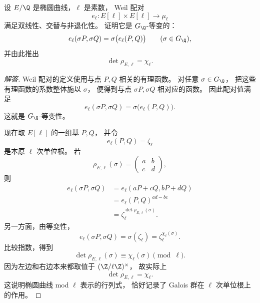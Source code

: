 \begin{exercise}
设 $E/\Q$ 是椭圆曲线，$\ell$ 是素数，
Weil 配对
\[
  e_\ell\colon E[\ell]\times E[\ell]\to \mu_\ell
\]
满足双线性、交替与非退化性。
证明它是 $G_\Q$-等变的：
\[
  e_\ell(\sigma P,\sigma Q)=\sigma\bigl(e_\ell(P,Q)\bigr)
  \qquad (\sigma\in G_\Q),
\]
并由此推出
\[
  \det\rho_{E,\ell}=\chi_\ell.
\]
\end{exercise}

\begin{proof}[解答]
Weil 配对的定义使用与点 $P,Q$ 相关的有理函数。
对任意 $\sigma\in G_\Q$，
把这些有理函数的系数整体施以 $\sigma$，
便得到与点 $\sigma P,\sigma Q$ 相对应的函数。
因此配对值满足
\[
  e_\ell(\sigma P,\sigma Q)=\sigma\bigl(e_\ell(P,Q)\bigr).
\]
这就是 $G_\Q$-等变性。

现在取 $E[\ell]$ 的一组基 $P,Q$，
并令
\[
  e_\ell(P,Q)=\zeta_\ell
\]
是本原 $\ell$ 次单位根。
若
\[
  \rho_{E,\ell}(\sigma)=
  \begin{pmatrix}
    a&b\\ c&d
  \end{pmatrix},
\]
则
\begin{align*}
  e_\ell(\sigma P,\sigma Q)
  &=e_\ell(aP+cQ,bP+dQ)\\
  &=e_\ell(P,Q)^{ad-bc}\\
  &=\zeta_\ell^{\det\rho_{E,\ell}(\sigma)}.
\end{align*}
另一方面，由等变性，
\[
  e_\ell(\sigma P,\sigma Q)=\sigma(\zeta_\ell)=\zeta_\ell^{\chi_\ell(\sigma)}.
\]
比较指数，得到
\[
  \det\rho_{E,\ell}(\sigma)\equiv \chi_\ell(\sigma)\pmod \ell.
\]
因为左边和右边本来都取值于 $(\Z/\ell\Z)^\times$，
故实际上
\[
  \det\rho_{E,\ell}=\chi_\ell.
\]
这说明椭圆曲线 mod $\ell$ 表示的行列式，
恰好记录了 Galois 群在 $\ell$ 次单位根上的作用。
\end{proof}
